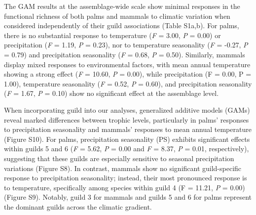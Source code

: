 \documentclass[
]{agujournal2019}
\begin{document}
The GAM results at the assemblage-wide scale show minimal responses in
the functional richness of both palms and mammals to climatic variation
when considered independently of their guild associations (Table S1a,b).
For palms, there is no substantial response to temperature (\emph{F} =
3.00, \emph{P} = 0.00) or precipitation (\emph{F} = 1.19, \emph{P} =
0.23), nor to temperature seasonality (\emph{F} = -0.27, \emph{P} =
0.79) and precipitation seasonality (\emph{F} = 0.68, \emph{P} = 0.50).
Similarly, mammals display mixed responses to environmental factors,
with mean annual temperature showing a strong effect (\emph{F} = 10.60,
\emph{P} = 0.00), while precipitation (F = 0.00, P = 1.00), temperature
seasonality (\emph{F} = 0.52, \emph{P} = 0.60), and precipitation
seasonality (\emph{F} = 1.67, \emph{P} = 0.10) show no significant
effect at the assemblage level.

When incorporating guild into our analyses, generalized additive models
(GAMs) reveal marked differences between trophic levels, particularly in
palms' responses to precipitation seasonality and mammals' responses to
mean annual temperature (Figure S10). For palms, precipitation
seasonality (PS) exhibits significant effects within guilds 5 and 6
(\emph{F} = 5.62, \emph{P} = 0.00 and \emph{F} = 8.37, \emph{P} = 0.01,
respectively), suggesting that these guilds are especially sensitive to
seasonal precipitation variations (Figure S8). In contrast, mammals show
no significant guild-specific response to precipitation seasonality;
instead, their most pronounced response is to temperature, specifically
among species within guild 4 (F = 11.21, \emph{P} = 0.00) (Figure S9).
Notably, guild 3 for mammals and guilds 5 and 6 for palms represent the
dominant guilds across the climatic gradient.
\end{document}
